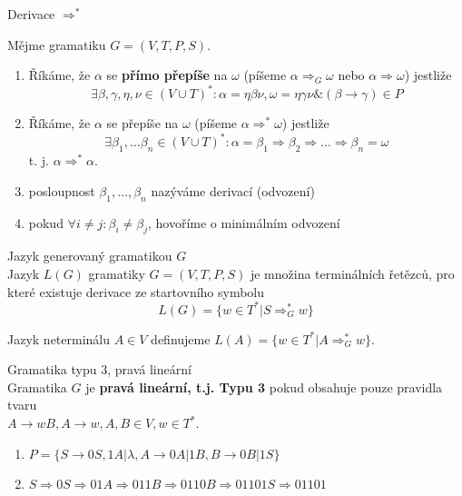 \documentclass[../main.tex]{subfiles}
\begin{document}
\begin{definition}
    Derivace $\Rightarrow^*$

    Mějme gramatiku $G = (V,T,P,S)$.
    \begin{enumerate}
        \item Říkáme, že $\alpha$ se \textbf{přímo přepíše} na $\omega$ (píšeme $\alpha \Rightarrow_{G}\omega$
        nebo $\alpha \Rightarrow \omega$) jestliže 
        \[\exists \beta,\gamma,\eta ,\nu \in (V \cup T)^* : \alpha = \eta \beta \nu, \omega = \eta \gamma \nu \& (\beta \rightarrow \gamma) \in P\]
        \item Říkáme, že $\alpha$ se přepíše na $\omega$ (píšeme $\alpha \Rightarrow^* \omega$) jestliže
        \[\exists \beta_1,\dots \beta_n \in (V \cup T)^* : \alpha = \beta_1 \Rightarrow \beta_2 \Rightarrow \dots \Rightarrow \beta_n = \omega\]
        t. j. $\alpha \Rightarrow^* \alpha$.
        \item posloupnost $\beta_1,\dots , \beta_n$ nazýváme derivací (odvození)
        \item pokud $\forall i \neq j : \beta_i \neq \beta_j$, hovoříme o minimálním odvození
        
    \end{enumerate}
\end{definition}

\begin{definition}
    Jazyk generovaný gramatikou $G$\\

    Jazyk $L(G)$ gramatiky $G = (V,T,P,S)$ je množina terminálních řetězců, pro které existuje derivace ze startovního symbolu
    \[L(G) = \{w \in T^* |S \Rightarrow^*_G w\}\]

    Jazyk neterminálu $A \in V$ definujeme $L(A) = \{w \in T^* | A \Rightarrow^*_G w\}$.
\end{definition}
\begin{definition}
    Gramatika typu 3, pravá lineární\\

    Gramatika $G$ je \textbf{pravá lineární, t.j. Typu 3} pokud obsahuje pouze pravidla tvaru\\

    $A \rightarrow wB,A\rightarrow w, A,B \in V, w \in T^*$.
\end{definition}
\begin{example}


    \begin{enumerate}
        \item $P = \{S \rightarrow 0S, 1A|\lambda, A\rightarrow 0A|1B, B\rightarrow 0B|1S\}$
        \item $S \Rightarrow 0S \Rightarrow 01A \Rightarrow 011B \Rightarrow 0110B \Rightarrow 01101S \Rightarrow 01101$
    \end{enumerate}
\end{example}
\end{document}
